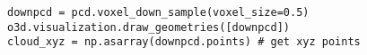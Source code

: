 \begin{lstlisting}
downpcd = pcd.voxel_down_sample(voxel_size=0.5)
o3d.visualization.draw_geometries([downpcd])
cloud_xyz = np.asarray(downpcd.points) # get xyz points
\end{lstlisting}